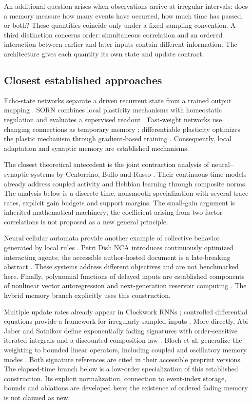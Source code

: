 \documentclass[11pt,a4paper]{article}
\theoremstyle{definition}\newtheorem{definition}[theorem]{Definition}
\begin{document}
An additional question arises when observations arrive at irregular intervals: does a memory measure how many events have occurred, how much time has passed, or both? These quantities coincide only under a fixed sampling convention. A third distinction concerns order: simultaneous correlation and an ordered interaction between earlier and later inputs contain different information. The architecture gives each quantity its own state and update contract.

\subsection{Closest established approaches}
Echo-state networks separate a driven recurrent state from a trained output mapping \cite{jaeger2001}. SORN combines local plasticity mechanisms with homeostatic regulation and evaluates a supervised readout \cite{lazar2009}. Fast-weight networks use changing connections as temporary memory \cite{ba2016}; differentiable plasticity optimizes the plastic mechanism through gradient-based training \cite{miconi2018}. Consequently, local adaptation and synaptic memory are established mechanisms.

The closest theoretical antecedent is the joint contraction analysis of neural--synaptic systems by Centorrino, Bullo and Russo \cite{centorrino2024}. Their continuous-time models already address coupled activity and Hebbian learning through composite norms. The analysis below is a discrete-time, nonsmooth specialization with several trace rates, explicit gain budgets and support margins. The small-gain argument is inherited mathematical machinery; the coefficient arising from two-factor correlations is not proposed as a new general principle.

Neural cellular automata provide another example of collective behavior generated by local rules \cite{mordvintsev2020}. Petri Dish NCA introduces continuously optimized interacting agents; the accessible author-hosted document is a late-breaking abstract \cite{zhang2025}. These systems address different objectives and are not benchmarked here. Finally, polynomial functions of delayed inputs are established components of nonlinear vector autoregression and next-generation reservoir computing \cite{gauthier2021}. The hybrid memory branch explicitly uses this construction.

Multiple update rates already appear in Clockwork RNNs \cite{koutnik2014}; controlled differential equations provide a framework for irregularly sampled inputs \cite{kidger2020}. More directly, Abi Jaber and Sotnikov define exponentially fading signatures with order-sensitive iterated integrals and a discounted composition law \cite{abijaber2025}. Bloch et al. generalize the weighting to bounded linear operators, including coupled and oscillatory memory modes \cite{bloch2026}. Both signature references are cited in their accessible preprint versions. The elapsed-time branch below is a low-order specialization of this established construction. Its explicit normalization, connection to event-index storage, bounds and ablations are developed here; the existence of ordered fading memory is not claimed as new.
\end{document}
